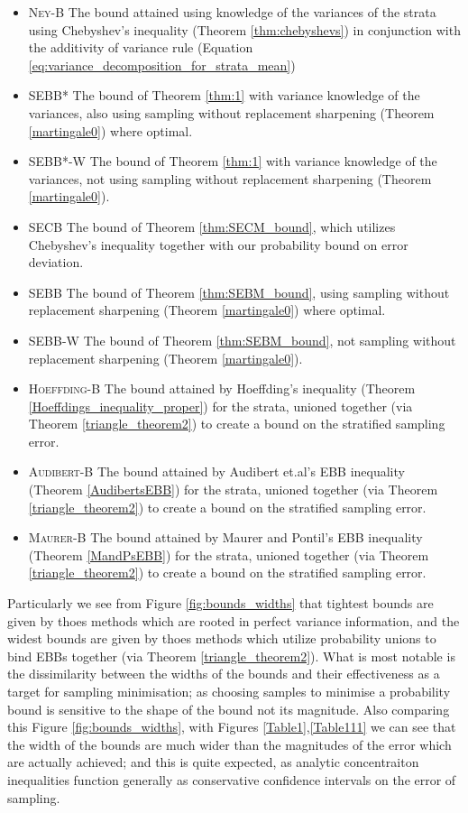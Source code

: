 \begin{itemize}
\item 
\textsc{Ney-B} The bound attained using knowledge of the variances of the strata using Chebyshev's inequality (Theorem \ref{thm:chebyshevs}) in conjunction with the additivity of variance rule (Equation \ref{eq:variance_decomposition_for_strata_mean})
\item 
\textsc{SEBB*} The bound of Theorem \ref{thm:1} with variance knowledge of the variances, also using sampling without replacement sharpening (Theorem \ref{martingale0}) where optimal.
\item 
\textsc{SEBB*-W} The bound of Theorem \ref{thm:1} with variance knowledge of the variances, not using sampling without replacement sharpening (Theorem \ref{martingale0}).
\item 
\textsc{SECB} The bound of Theorem \ref{thm:SECM_bound}, which utilizes Chebyshev's inequality together with our probability bound on error deviation.
\item 
\textsc{SEBB} The bound of Theorem \ref{thm:SEBM_bound}, using sampling without replacement sharpening (Theorem \ref{martingale0}) where optimal.
\item 
\textsc{SEBB-W} The bound of Theorem \ref{thm:SEBM_bound}, not sampling without replacement sharpening (Theorem \ref{martingale0}).
\item 
\textsc{Hoeffding-B} The bound attained by Hoeffding's inequality (Theorem \ref{Hoeffdings_inequality_proper}) for the strata, unioned together (via Theorem \ref{triangle_theorem2}) to create a bound on the stratified sampling error.
\item 
\textsc{Audibert-B} The bound attained by Audibert et.al's EBB inequality (Theorem \ref{AudibertsEBB}) for the strata, unioned together (via Theorem \ref{triangle_theorem2}) to create a bound on the stratified sampling error.
\item 
\textsc{Maurer-B} The bound attained by Maurer and Pontil's EBB inequality (Theorem \ref{MandPsEBB}) for the strata, unioned together (via Theorem \ref{triangle_theorem2}) to create a bound on the stratified sampling error.
\end{itemize}

Particularly we see from Figure \ref{fig:bounds_widths} that tightest bounds are given by thoes methods which are rooted in perfect variance information, and the widest bounds are given by thoes methods which utilize probability unions to bind EBBs together (via Theorem \ref{triangle_theorem2}).
What is most notable is the dissimilarity between the widths of the bounds and their effectiveness as a target for sampling minimisation; as choosing samples to minimise a probability bound is sensitive to the shape of the bound not its magnitude.
Also comparing this Figure \ref{fig:bounds_widths}, with Figures \ref{Table1},\ref{Table111} we can see that the width of the bounds are much wider than the magnitudes of the error which are actually achieved; and this is quite expected, as analytic concentraiton inequalities function generally as conservative confidence intervals on the error of sampling.


